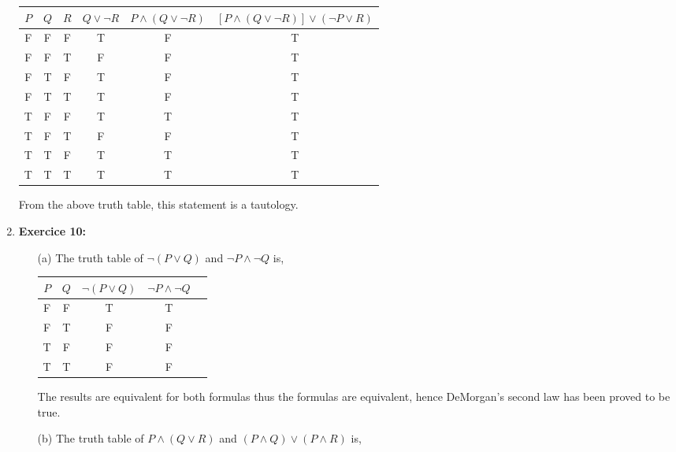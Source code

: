 \documentclass{article} %
\begin{document}
\begin{enumerate}
    \begin{center}
    \begin{tabular}{cccccc}
        $P$ & $Q$ & $R$ & $Q \lor \neg R$ & $P \land (Q \lor \neg R)$ & $[P \land (Q \lor \neg R)] \lor (\neg P \lor R)$ \\
        \hline
        F & F & F & T & F & T \\
        F & F & T & F & F & T \\
        F & T & F & T & F & T \\
        F & T & T & T & F & T \\
        T & F & F & T & T & T \\
        T & F & T & F & F & T \\
        T & T & F & T & T & T \\
        T & T & T & T & T & T \\
    \end{tabular}
    \end{center}

    From the above truth table, this statement is a tautology.

    \item \textbf{Exercice 10:}

    \begin{itemize}
        \item[(a)] The truth table of $\neg (P \lor Q)$ and $\neg P \land \neg Q$ is,

        \begin{center}
        \begin{tabular}{ccccc}
            $P$ & $Q$ & $\neg(P \lor Q)$ & $\neg P \land \neg Q$ \\
            \hline
            F & F & T & T \\
            F & T & F & F \\
            T & F & F & F \\
            T & T & F & F \\
        \end{tabular}
        \end{center}

        The results are equivalent for both formulas thus the formulas are equivalent, hence DeMorgan's second law has been proved to be true.

        \item[(b)] The truth table of $P \land (Q \lor R)$ and $(P \land Q) \lor (P \land R)$ is,


\end{itemize}
\end{enumerate}
\end{document}
